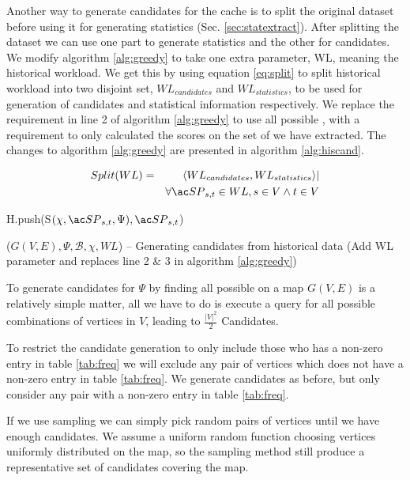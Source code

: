 Another way to generate candidates for the cache is to split the original dataset before using it for generating statistics (Sec. \ref{sec:statextract}). 
After splitting the dataset we can use one part to generate statistics and the other for candidates. We modify algorithm \ref{alg:greedy} to take one extra parameter, WL, meaning the historical workload. We get this by using equation \ref{eq:split} to split historical workload into two disjoint set, $WL_{candidates}$ and $WL_{statistics}$, to be used for generation of candidates and statistical information respectively. We replace the requirement in line 2 of algorithm \ref{alg:greedy} to use all possible \spathsns, with a requirement to only calculated the scores on the set of \spaths we have extracted. The changes to algorithm \ref{alg:greedy} are presented in algorithm \ref{alg:hiscand}.


\begin{eqnarray} \label{eq:split}
Split({WL}) &=& \langle WL_{candidates}, WL_{statistics} \rangle | \nonumber \\
	    & & \forall \spath_{s,t} \in WL, s \in V \wedge t \in V 
\end{eqnarray}


\begin{algorithm} [H!bt]
\dontprintsemicolon
\SetVline

{
    H.push(S$(\chi, \spath_{s,t}, \Psi), \spath_{s,t}$) \;
}

\caption{\salgons($G(V,E), \Psi, \mathcal{B}, \chi, WL$) -- Generating candidates from historical data (Add WL parameter and replaces line 2 \& 3 in algorithm \ref{alg:greedy})}
\label{alg:hiscand}
\end{algorithm}

To generate \spath candidates for $\Psi$ by finding all possible \spath on a map $G(V,E)$ is a relatively simple matter, all we have to do is execute a \spath query for all possible combinations of vertices in $V$, leading to $\frac{|V|^2}{2}$ Candidates.

To restrict the candidate generation to only include those who has a non-zero entry in table \ref{tab:freq} we will exclude any pair of vertices which does not have a non-zero entry in table \ref{tab:freq}. We generate candidates as before, but only consider any pair with a non-zero entry in table \ref{tab:freq}.

If we use sampling we can simply pick random pairs of vertices until we have enough candidates. We assume a uniform random function choosing vertices uniformly distributed on the map, so the sampling method still produce a representative set of candidates covering the map.

